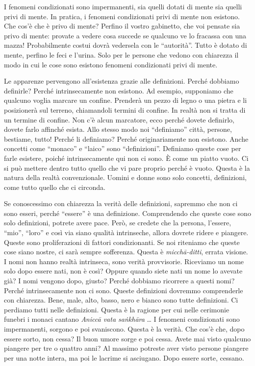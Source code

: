 I fenomeni condizionati sono impermanenti, sia quelli dotati di mente
sia quelli privi di mente. In pratica, i fenomeni condizionati privi di
mente non esistono. Che cos'è che è privo di mente? Perfino il vostro
gabinetto, che voi pensate sia privo di mente: provate a vedere cosa
succede se qualcuno ve lo fracassa con una mazza! Probabilmente costui
dovrà vedersela con le ``autorità''. Tutto è dotato di mente, perfino le
feci e l'urina. Solo per le persone che vedono con chiarezza il modo in
cui le cose sono esistono fenomeni condizionati privi di mente.

Le apparenze pervengono all'esistenza grazie alle definizioni. Perché
dobbiamo definirle? Perché intrinsecamente non esistono. Ad esempio,
supponiamo che qualcuno voglia marcare un confine. Prenderà un pezzo di
legno o una pietra e li posizionerà sul terreno, chiamandoli termini di
confine. In realtà non si tratta di un termine di confine. Non c'è alcun
marcatore, ecco perché dovete definirlo, dovete farlo affinché esista.
Allo stesso modo noi ``definiamo'' città, persone, bestiame, tutto!
Perché li definiamo? Perché originariamente non esistono. Anche concetti
come ``monaco'' e ``laico'' sono ``definizioni''. Definiamo queste cose
per farle esistere, poiché intrinsecamente qui non ci sono. È come un
piatto vuoto. Ci si può mettere dentro tutto quello che vi pare proprio
perché è vuoto. Questa è la natura della realtà convenzionale. Uomini e
donne sono solo concetti, definizioni, come tutto quello che ci
circonda.

Se conoscessimo con chiarezza la verità delle definizioni, sapremmo che
non ci sono esseri, perché ``essere'' è una definizione. Comprendendo
che queste cose sono solo definizioni, potrete avere pace. Però, se
credete che la persona, l'essere, ``mio'', ``loro'' e così via siano
qualità intrinseche, allora dovrete ridere e piangere. Queste sono
proliferazioni di fattori condizionanti. Se noi riteniamo che queste
cose siano nostre, ci sarà sempre sofferenza. Questa è
\emph{micchā-ditti}, errata visione. I nomi non hanno realtà intrinseca,
sono verità provvisorie. Riceviamo un nome solo dopo essere nati, non è
così? Oppure quando siete nati un nome lo avevate già? I nomi vengono
dopo, giusto? Perché dobbiamo ricorrere a questi nomi? Perché
intrinsecamente non ci sono. Queste definizioni dovremmo comprenderle
con chiarezza. Bene, male, alto, basso, nero e bianco sono tutte
definizioni. Ci perdiamo tutti nelle definizioni. Questa è la ragione
per cui nelle cerimonie funebri i monaci cantano \emph{Aniccā vata
saṅkhāra} \ldots{} I fenomeni condizionati sono impermanenti, sorgono e poi
svaniscono. Questa è la verità. Che cos'è che, dopo essere sorto, non
cessa? Il buon umore sorge e poi cessa. Avete mai visto qualcuno
piangere per tre o quattro anni? Al massimo potreste aver visto persone
piangere per una notte intera, ma poi le lacrime si asciugano. Dopo
essere sorte, cessano.


